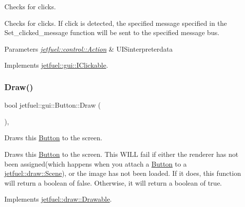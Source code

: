 Checks for clicks. 

Checks for clicks. If click is detected, the specified message specified in the Set\+\_\+clicked\+\_\+message function will be sent to the specified message bus.


\begin{DoxyParams}{Parameters}
{\em \hyperlink{structjetfuel_1_1control_1_1Action}{jetfuel\+::control\+::\+Action}} & U\+I\+Sinterpreterdata \\
\hline
\end{DoxyParams}


Implements \hyperlink{classjetfuel_1_1gui_1_1IClickable_aea45de37bd3beb7eb7e2e3056e4e37b3}{jetfuel\+::gui\+::\+I\+Clickable}.

\mbox{\label{classjetfuel_1_1gui_1_1Button_a1c8ec68b90dc461b1603c47fb8c509c4}} 
\subsubsection{\texorpdfstring{Draw()}{Draw()}}
{\footnotesize\ttfamily bool jetfuel\+::gui\+::\+Button\+::\+Draw (\begin{DoxyParamCaption}{ }\end{DoxyParamCaption})\hspace{0.3cm}{\ttfamily [override]}, {\ttfamily [virtual]}}



Draws this \hyperlink{classjetfuel_1_1gui_1_1Button}{Button} to the screen. 

Draws this \hyperlink{classjetfuel_1_1gui_1_1Button}{Button} to the screen. This W\+I\+LL fail if either the renderer has not been assigned(which happens when you attach a \hyperlink{classjetfuel_1_1gui_1_1Button}{Button} to a \hyperlink{classjetfuel_1_1draw_1_1Scene}{jetfuel\+::draw\+::\+Scene}), or the image has not been loaded. If it does, this function will return a boolean of false. Otherwise, it will return a boolean of true. 

Implements \hyperlink{classjetfuel_1_1draw_1_1Drawable_a1a072070322965ce9411ee6e7c311c56}{jetfuel\+::draw\+::\+Drawable}.

\mbox{\label{classjetfuel_1_1gui_1_1Button_ae1e89337652fc30fb7c4997f5b887da3}} 
